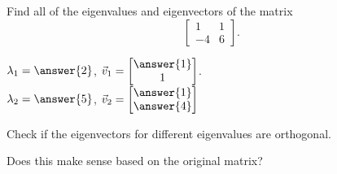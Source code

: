 \documentclass{ximera}
\begin{document}
\begin{exercise}%
    Find all of the eigenvalues and eigenvectors of the matrix
    \[ 
        \begin{bmatrix}
            1 & 1 \\ 
            -4 & 6 
        \end{bmatrix}. 
    \]
    
    $\lambda_1 = \answer{2}$, $\vec{v}_1 = \begin{bmatrix} \answer{1} \\ 1 \end{bmatrix}$. \\
    $\lambda_2 = \answer{5}$, $\vec{v}_2 = \begin{bmatrix} \answer{1}\\ \answer{4} \end{bmatrix}$
    \begin{problem}
        Check if the eigenvectors for different eigenvalues are orthogonal. 
        \begin{multipleChoice}
        \end{multipleChoice}
        \begin{problem}
            Does this make sense based on the original matrix? 
        \end{problem}
    \end{problem}
\end{exercise}
\end{document}
